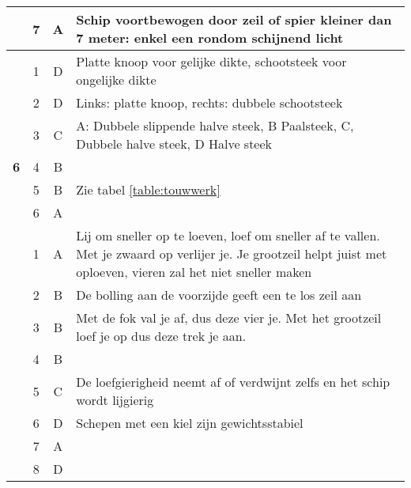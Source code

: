 \begin{table}[h]
\begin{tabular}{c|c|c|m{9.5cm}}
   		& 7 & A &  Schip voortbewogen door zeil of spier kleiner dan 7 meter: enkel een rondom schijnend licht\\ \cline{2-4} \hline
   		\multirow{7}{*}{\sffamily\bfseries{\textcolor{ocre}{\LARGE6}} } 
   		& 1 & D & Platte knoop voor gelijke dikte, schootsteek voor ongelijke dikte \\ \cline{2-4} 
   		& 2 & D & Links: platte knoop, rechts: dubbele schootsteek \\ \cline{2-4} 
   		& 3 & C & A: Dubbele slippende halve steek, B Paalsteek, C, Dubbele halve steek, D Halve steek \\ \cline{2-4} 
   		& 4 & B &  \\ \cline{2-4} 
   		& 5 & B &  Zie tabel \ref{table:touwwerk}\\ \cline{2-4} 
   		& 6 & A &  \\ \cline{2-4} \hline 
  		\multirow{8}{*}{\sffamily\bfseries{\textcolor{ocre}{\LARGE7}} } 
   		& 1 & A &  Lij om sneller op te loeven, loef om sneller af te vallen. Met
   		je zwaard op verlijer je. Je grootzeil helpt juist met oploeven,
   		vieren zal het niet sneller maken \\ \cline{2-4} 
   		& 2 & B &  De bolling aan de voorzijde geeft een te los zeil aan\\ \cline{2-4} 
   		& 3 & B &  Met de fok val je af, dus deze vier je. Met het grootzeil loef je
   		op dus deze trek je aan.\\ \cline{2-4} 
   		& 4 & B &  \\ \cline{2-4} 
   		& 5 & C &  De loefgierigheid neemt af of verdwijnt zelfs en het schip wordt lijgierig  \\ \cline{2-4} 
   		& 6 & D &  Schepen met een kiel zijn gewichtsstabiel\\ \cline{2-4} 
   		& 7 & A &  \\ \cline{2-4}
   		& 8 & D &  \\ \cline{2-4} \hline
	\end{tabular}
\end{table}

